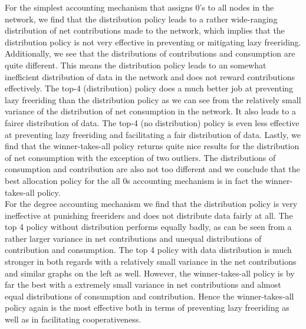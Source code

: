 \noindent{}For the simplest accounting mechanism that assigns $0$'s to all nodes in the network, we find that the distribution policy leads to a rather wide-ranging distribution of net contributions made to the network, which implies that the distribution policy is not very effective in preventing or mitigating lazy freeriding. Additionally, we see that the distributions of contributions and consumption are quite different. This means the distribution policy leads to an somewhat inefficient distribution of data in the network and does not reward contributions effectively. The top-4 (distribution) policy does a much better job at preventing lazy freeriding than the distribution policy as we can see from the relatively small variance of the distribution of net consumption in the network. It also leads to a fairer distribution of data. The top-4 (no distribution) policy is even less effective at preventing lazy freeriding and facilitating a fair distribution of data. Lastly, we find that the winner-takes-all policy returns quite nice results for the distribution of net consumption with the exception of two outliers. The distributions of consumption and contribution are also not too different and we conclude that the best allocation policy for the all $0$s accounting mechanism is in fact the winner-takes-all policy. \vspace{1em}\\

\noindent{}For the degree accounting mechanism we find that the distribution policy is very ineffective at punishing freeriders and does not distribute data fairly at all. The top 4 policy without distribution performs equally badly, as can be seen from a rather larger variance in net contributions and unequal distributions of contribution and consumption. The top 4 policy with data distribution is much stronger in both regards with a relatively small variance in the net contributions and similar graphs on the left as well. However, the winner-takes-all policy is by far the best with a extremely small variance in net contributions and almost equal distributions of consumption and contribution. Hence the winner-takes-all policy again is the most effective both in terms of preventing lazy freeriding as well as in facilitating cooperativeness. \vspace{1em}\\

